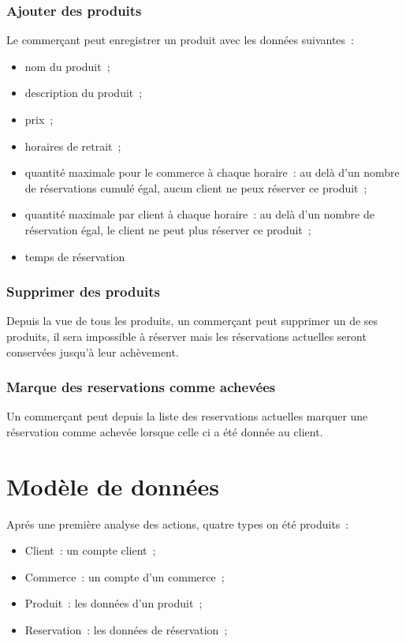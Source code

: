 \documentclass[a4paper,12pt]{article}
\begin{document}
\subsubsection{Ajouter des produits}

Le commerçant peut enregistrer un produit avec les données suivantes~:

\begin{itemize}
	\item nom du produit~;
	\item description du produit~;
	\item prix~;
	\item horaires de retrait~;
	\item quantité maximale pour le commerce à chaque horaire~: au delà d'un nombre de réservations cumulé égal, aucun client ne peux réserver ce produit~;
	\item quantité maximale par client à chaque horaire~: au delà d'un nombre de réservation égal, le client ne peut plus réserver ce produit~;
	\item temps de réservation 
\end{itemize}


\subsubsection{Supprimer des produits}

Depuis la vue de tous les produits, un commerçant peut supprimer un de ses produits, il sera impossible à réserver mais les réservations actuelles seront conservées jusqu'à leur achèvement.

\subsubsection{Marque des reservations comme achevées}

Un commerçant peut depuis la liste des reservations actuelles marquer une réservation comme achevée lorsque celle ci a été donnée au client.

\section{Modèle de données}

Aprés une première analyse des actions, quatre types on été produits~:
\begin{itemize}
	\item Client~: un compte client~;
	\item Commerce~: un compte d'un commerce~;
	\item Produit~: les données d'un produit~;
	\item Reservation~: les données de réservation~;
\end{itemize}
\end{document}
